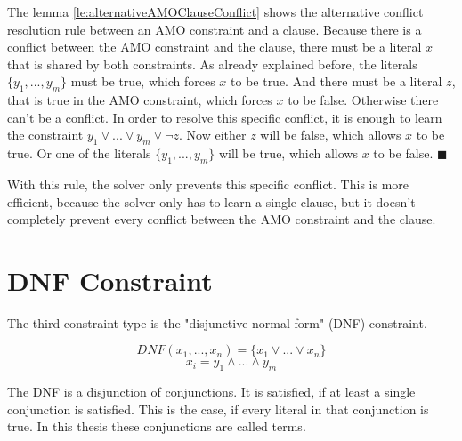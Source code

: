 The lemma \ref{le:alternativeAMOClauseConflict} shows the alternative conflict resolution rule between an AMO constraint and a clause. Because there is a conflict between the AMO constraint and the clause, there must be a literal $x$ that is shared by both constraints. As already explained before, the literals $\{y_1,...,y_m\}$ must be true, which forces $x$ to be true. And there must be a literal $z$, that is true in the AMO constraint, which forces $x$ to be false. Otherwise there can't be a conflict. In order to resolve this specific conflict, it is enough to learn the constraint $y_1 \vee ... \vee y_m \vee \neg z$. Now either $z$ will be false, which allows $x$ to be true. Or one of the literals $\{y_1,...,y_m\}$ will be true, which allows $x$ to be false. $\blacksquare$

With this rule, the solver only prevents this specific conflict. This is more efficient, because the solver only has to learn a single clause, but it doesn't completely prevent every conflict between the AMO constraint and the clause.

\section{DNF Constraint}
The third constraint type is the "disjunctive normal form" (DNF) constraint.
\begin{leftbar}
\begin{displaymath}
DNF(x_1,...,x_n) = \{x_1 \vee ... \vee x_n \}
\end{displaymath}
\begin{displaymath}
x_i = y_1 \wedge ... \wedge y_m
\end{displaymath}
\end{leftbar}
The DNF is a disjunction of conjunctions. It is satisfied, if at least a single conjunction is satisfied. This is the case, if every literal in that conjunction is true. In this thesis these conjunctions are called terms.

